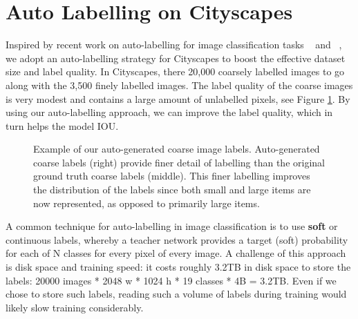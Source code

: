 \documentclass{article}
\begin{document}
\section{Auto Labelling on Cityscapes}

Inspired by recent work on auto-labelling for image classification tasks ~\cite{xie2019selftraining} and ~\cite{tarvainen2017mean}, we adopt an auto-labelling strategy for Cityscapes to boost the effective dataset size and label quality. In Cityscapes, there 20,000 coarsely labelled images to go along with the 3,500 finely labelled images. The label quality of the coarse images is very modest and contains a large amount of unlabelled pixels, see Figure \ref{fig:fig4}. By using our auto-labelling approach, we can improve the label quality, which in turn helps the model IOU. 

\begin{figure}
\large
\centering
{}
\caption{Example of our auto-generated coarse image labels. Auto-generated coarse labels (right) provide finer detail of labelling than the original ground truth coarse labels (middle). This finer labelling improves the distribution of the labels since both small and large items are now represented, as opposed to primarily large items.}
\label{fig:teaser_comp}

\label{fig:fig4}
\end{figure}

A common technique for auto-labelling in image classification is to use \textbf{soft} or continuous labels, whereby a teacher network provides a target (soft) probability for each of N classes for every pixel of every image. A challenge of this approach is disk space and training speed: it costs roughly 3.2TB in disk space to store the labels: 20000 images * 2048 w * 1024 h * 19 classes * 4B = 3.2TB. Even if we chose to store such labels, reading such a volume of labels during training would likely slow training considerably.
\end{document}
